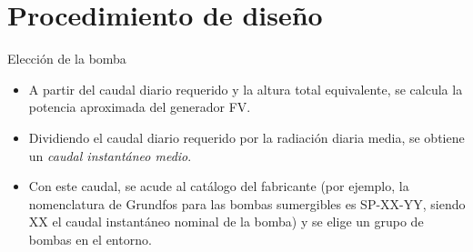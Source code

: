 \documentclass[xcolor={usenames,svgnames,dvipsnames}]{beamer}
\begin{document}
\section{Procedimiento de diseño}
\label{sec:org5f0a8c6}

\begin{frame}[label={sec:org960be49}]{Elección de la bomba}
\begin{itemize}
\item A partir del caudal diario requerido y la altura total equivalente, se calcula la potencia aproximada del generador FV.

\item Dividiendo el caudal diario requerido por la radiación diaria media, se obtiene un \emph{caudal instantáneo medio}.

\item Con este caudal, se acude al catálogo del fabricante (por ejemplo, la nomenclatura de Grundfos para las bombas sumergibles es SP-XX-YY, siendo XX el caudal instantáneo nominal de la bomba) y se elige un grupo de bombas en el entorno.
\end{itemize}
\end{frame}
\end{document}
